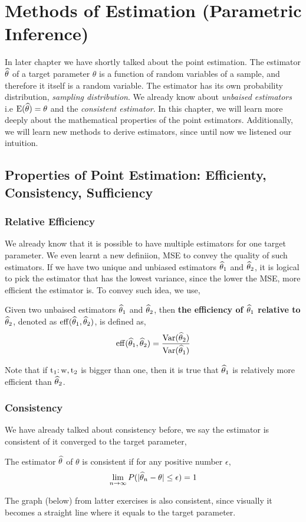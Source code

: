 \chapter{Methods of Estimation (Parametric Inference)}
In later chapter we have shortly talked about the point estimation. The estimator ${\widehat{\theta}}$ of a target parameter $\theta$ is a function of random variables of a sample, and therefore it itself is a random variable.
The estimator has its own probability distribution, \textit{sampling distribution}. We already know about \textit{unbaised estimators} i.e ${\operatorname{E}}({\widehat{\theta}}) = \theta$ and the \textit{consistent estimator}. In this chapter, we will learn more deeply about the mathematical properties of the point estimators. Additionally, we will learn new methods to derive estimators, since until now we listened our intuition.
\section{Properties of Point Estimation: Efficienty, Consistency, Sufficiency}
\subsection*{Relative Efficiency}
We already know that it is possible to have multiple estimators for one target parameter. 
We even learnt a new definiion, MSE to convey the quality of such estimators.
If we have two unique and unbiased estimators ${\widehat{\theta}}_1$ and ${\widehat{\theta}}_2$, it is logical to pick the estimator that has the lowest variance, since the lower the MSE, more efficient the estimator is. To convey such idea, we use, 
\begin{definition}
    Given two unbaised estimators ${\widehat{\theta}}_1$ and ${\widehat{\theta}}_2$, then \textbf{the efficiency of ${\widehat{\theta}}_1$ relative to ${\widehat{\theta}}_2$}, denoted as $\operatorname{eff}({\widehat{\theta}}_1,{\widehat{\theta}}_2)$, is defined as,
    \[ \operatorname{eff}({\widehat{\theta}}_1, {\widehat{\theta}}_2) = \frac{{\operatorname{Var}}({\widehat{\theta}}_2)}{{\operatorname{Var}}({\widehat{\theta}}_1)} \]

    Note that  if $\operatorname{t_1:w, t_2}$ is bigger than one, then it is true that ${\widehat{\theta}}_1$ is relatively more efficient than ${\widehat{\theta}}_2$.
\end{definition}
\subsection*{Consistency}
We have already talked about consistency before, we say the estimator is consistent of it converged to the target parameter,
\begin{definition}
        The estimator ${\widehat{\theta}}$ of $\theta$ is consistent if for any positive number $\epsilon$,
    \[ \lim_{n \rightarrow \infty} P(| {\widehat{\theta}}_{n} - \theta| \le \epsilon) = 1 \]
\end{definition}
The graph (below) from latter exercises is also consistent, since visually it becomes a straight line where it equals to the target parameter.

